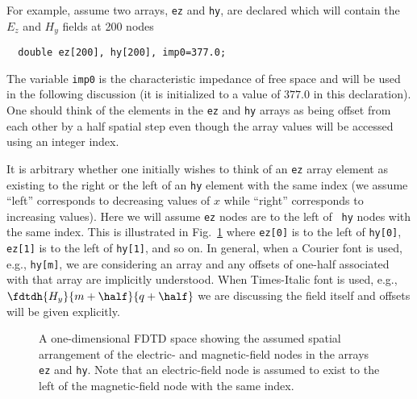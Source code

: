 For example, assume two arrays, {\tt ez} and {\tt hy}, are
declared which will contain the $E_z$ and $H_y$ fields at 200 nodes
\begin{verbatim}
  double ez[200], hy[200], imp0=377.0;
\end{verbatim}
The variable {\tt imp0} is the characteristic impedance of free space
and will be used in the following discussion (it is initialized to a
value of $377.0$ in this declaration).  One should think of the
elements in the {\tt ez} and {\tt hy} arrays as being offset from
each other by a half spatial step even though the array values will be
accessed using an integer index.  

It is arbitrary whether one initially wishes to think of an {\tt ez}
array element as existing to the right or the left of an {\tt hy}
element with the same index (we assume ``left'' corresponds to
decreasing values of $x$ while ``right'' corresponds to increasing
values).  Here we will assume {\tt ez} nodes are to the left of {\tt
  hy} nodes with the same index.  This is illustrated in Fig.\
\ref{fig:oneDArrays} where {\tt ez[0]} is to the left of {\tt hy[0]},
{\tt ez[1]} is to the left of {\tt hy[1]}, and so on.  In general,
when a Courier font is used, e.g., {\tt hy[m]}, we are considering an
array and any offsets of one-half associated with that array are
implicitly understood.  When Times-Italic font is used, e.g.,
$\fdtdh{H_y}{m+\half}{q+\half}$ we are discussing the field itself and
offsets will be given explicitly.
\begin{figure}
  \begin{center}
  \end{center}
  \caption{A one-dimensional FDTD space showing the assumed spatial
  arrangement of the electric- and magnetic-field nodes in the arrays
  {\tt ez} and {\tt hy}.  Note that an electric-field node is assumed
  to exist to the left of the magnetic-field node with the same
  index.}  \label{fig:oneDArrays}
\end{figure}

